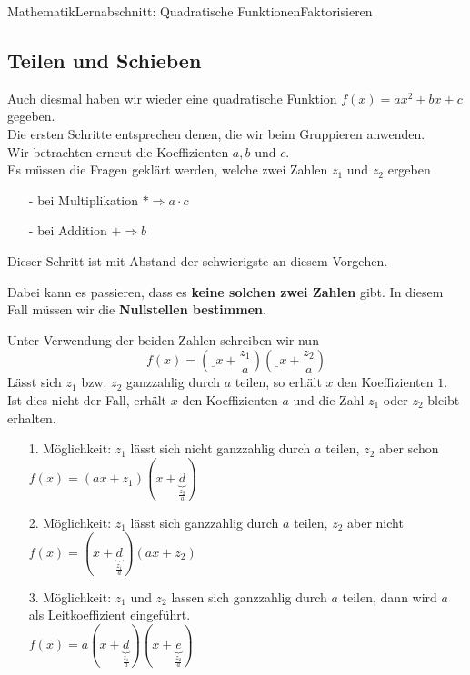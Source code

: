 \documentclass[11pt,twocolumn,oneside,openany,headings=optiontotoc,11pt,numbers=noenddot]{article}
\begin{document}
\begin{worksheet}{Mathematik}{Lernabschnitt: Quadratische Funktionen}{Faktorisieren}
		\subsection{Teilen und Schieben}
		Auch diesmal haben wir wieder eine quadratische Funktion \(f(x) = ax^2 + bx + c\) gegeben.\\
		Die ersten Schritte entsprechen denen, die wir beim Gruppieren anwenden.\\
		Wir betrachten erneut die Koeffizienten \(a,b \text{ und } c\).\\
		Es müssen die Fragen geklärt werden, welche zwei Zahlen \(z_1\) und \(z_2\) ergeben
		\begin{itemize}
			\item[-] bei Multiplikation \(*\Rightarrow a\cdot{}c\)
			\item[-] bei Addition \(+\Rightarrow b\)
		\end{itemize}
		Dieser Schritt ist mit Abstand der schwierigste an diesem Vorgehen.
		\begin{framed}
			\noindent
			Dabei kann es passieren, dass es \textbf{keine solchen zwei Zahlen} gibt. In diesem Fall müssen wir die \textbf{Nullstellen bestimmen}.
			\color{red}
		\end{framed}
		\normalcolor
		\noindent
		Unter Verwendung der beiden Zahlen schreiben wir nun \[f(x) = (\underline{\ \ }x + \frac{z_1}{a})(\underline{\ \ }x + \frac{z_2}{a})\]
		Lässt sich \(z_1\) bzw. \(z_2\) ganzzahlig durch \(a\) teilen, so erhält \(x\) den Koeffizienten \(1\).\\
		Ist dies nicht der Fall, erhält \(x\) den Koeffizienten \(a\) und die Zahl \(z_1\) oder \(z_2\) bleibt erhalten.\\
		\par\noindent
		\begin{itemize}
			\item[] 1. Möglichkeit: \(z_1\) lässt sich nicht ganzzahlig durch \(a\) teilen, \(z_2\) aber schon\\
			\(f(x) = (ax + z_1)(x+\underbrace{d}_{\frac{z_2}{a}})\)
			\item[] 2. Möglichkeit: \(z_1\) lässt sich ganzzahlig durch \(a\) teilen, \(z_2\) aber nicht\\
			\(f(x) = (x + \underbrace{d}_{\frac{z_1}{a}})(ax+z_2)\)
			\item[] 3. Möglichkeit: \(z_1\) und \(z_2\) lassen sich ganzzahlig durch \(a\) teilen, dann wird \(a\) als Leitkoeffizient eingeführt.\\
			\(f(x) = a(x+\underbrace{d}_{\frac{z_1}{a}})(x+\underbrace{e}_{\frac{z_2}{a}})\)

\end{itemize}
\end{worksheet}
\end{document}
